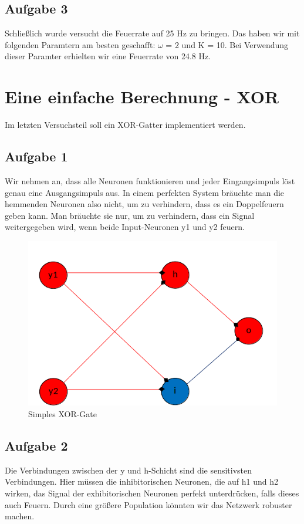 \documentclass[10pt,a4paper]{scrartcl}
\begin{document}
\subsection{Aufgabe 3}
Schließlich wurde versucht die Feuerrate auf 25 Hz zu bringen. Das haben wir mit folgenden Paramtern am besten geschafft: $\omega$ = 2 und K = 10. Bei Verwendung dieser Paramter erhielten wir eine Feuerrate von 24.8 Hz.


\newpage


\section{Eine einfache Berechnung - XOR}
Im letzten Versuchsteil soll ein XOR-Gatter implementiert werden.

\subsection{Aufgabe 1}
Wir nehmen an, dass alle Neuronen funktionieren und jeder Eingangsimpuls löst genau eine Ausgangsimpuls aus. In einem perfekten System bräuchte man die hemmenden Neuronen also nicht, um zu verhindern, dass es ein Doppelfeuern geben kann. Man bräuchte sie nur, um zu verhindern, dass ein Signal weitergegeben wird, wenn beide Input-Neuronen y1 und y2 feuern.

\begin{figure} [ht]
\begin{center}
\label{fig:abb41}
\caption{Simples XOR-Gate}
\includegraphics[scale=0.45]{pictures/xor_gatter.png}
\end{center}
\end{figure}


\subsection{Aufgabe 2}
Die Verbindungen zwischen der y und h-Schicht sind die sensitivsten Verbindungen. Hier müssen die inhibitorischen Neuronen, die auf h1 und h2 wirken, das Signal der exhibitorischen Neuronen perfekt unterdrücken, falls dieses auch Feuern. Durch eine größere Population könnten wir das Netzwerk robuster machen.
\end{document}
